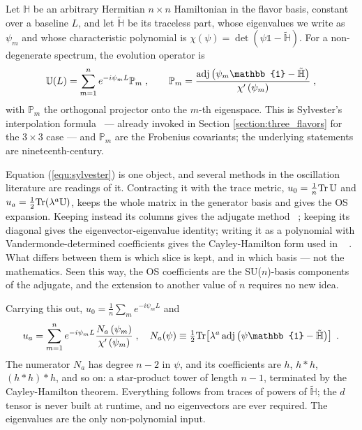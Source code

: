\documentclass[final,5p,times,twocolumn]{elsarticle}
\providecommand{\Ref}{} %
\providecommand{\DIFaddtex}[1]{{\protect\color{blue} \sf #1}} %
\providecommand{\DIFadd}[1]{\DIFaddtex{#1}} %
\begin{document}
\label{section:general_n}

\DIFadd{Let $\mathbb{H}$ be an arbitrary Hermitian $n \times n$ Hamiltonian in the flavor basis, constant over a baseline $L$, and let $\tilde{\mathbb{H}}$ be its traceless part, whose eigenvalues we write as $\psi_m$ and whose characteristic polynomial is $\chi(\psi) = \det(\psi \mathbb{1} - \tilde{\mathbb{H}})$.  For a non-degenerate spectrum, the evolution operator is
}\begin{equation}
 \label{equ:sylvester}
 \mathbb{U}(L)
 =
 \sum_{m=1}^n e^{-i\psi_m L} \mathbb{P}_m \;,
 \qquad
 \mathbb{P}_m
 =
 \frac{{\rm adj}\left(\psi_m \mathbb{1} - \tilde{\mathbb{H}}\right)}{\chi^\prime\left(\psi_m\right)} \;,
\end{equation}
\DIFadd{with $\mathbb{P}_m$ the orthogonal projector onto the $m$-th eigenspace.  This is Sylvester's interpolation formula\ }\cite{Sylvester:1883} \DIFadd{--- already invoked in Section \ref{section:three_flavors} for the $3 \times 3$ case --- and $\mathbb{P}_m$ are the Frobenius covariants; the underlying statements are nineteenth-century.
}

\DIFadd{Equation (\ref{equ:sylvester}) is one object, and several methods in the oscillation literature are readings of it.  Contracting it with the trace metric, $u_0 = \frac{1}{n}{\rm Tr}\,\mathbb{U}$ and $u_a = \frac{1}{2}{\rm Tr}(\lambda^a \mathbb{U})$, keeps the whole matrix in the generator basis and gives the OS expansion.  Keeping instead its columns gives the adjugate method\ }\cite{Sylvester:1883}\DIFadd{; keeping its diagonal gives the eigenvector-eigenvalue identity; writing it as a polynomial with Vandermonde-determined coefficients gives the Cayley-Hamilton form used in \Ref\ }\cite{Ohlsson:1999xb}\DIFadd{.  What differs between them is which slice is kept, and in which basis --- not the mathematics.  Seen this way, the OS coefficients are the SU($n$)-basis components of the adjugate, and the extension to another value of $n$ requires no new idea.
}

\DIFadd{Carrying this out, $u_0 = \frac{1}{n}\sum_m e^{-i\psi_m L}$ and
}\begin{equation}
 \label{equ:ua_general}
 u_a
 =
 \sum_{m=1}^n e^{-i\psi_m L}
 \frac{N_a\left(\psi_m\right)}{\chi^\prime\left(\psi_m\right)} \;,
 \quad
 N_a(\psi) \equiv \tfrac{1}{2}{\rm Tr}\!\left[\lambda^a\,{\rm adj}\left(\psi\mathbb{1}-\tilde{\mathbb{H}}\right)\right] \;.
\end{equation}
\DIFadd{The numerator $N_a$ has degree $n-2$ in $\psi$, and its coefficients are $h$, $h \ast h$, $\left(h \ast h\right) \ast h$, and so on: a star-product tower of length $n-1$, terminated by the Cayley-Hamilton theorem.  Everything follows from traces of powers of $\tilde{\mathbb{H}}$; the $d$ tensor is never built at runtime, and no eigenvectors are ever required.  The eigenvalues are the only non-polynomial input.
}
\end{document}
